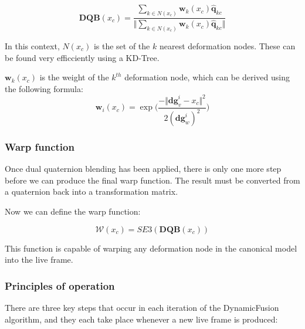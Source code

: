 \documentclass[a4paper]{article}
\begin{document}
$$\textbf{DQB}(x_c) = \frac{\sum_{k \in N(x_c)} \textbf{w}_k(x_c)\hat{\textbf{q}}_{kc}}{\Vert \sum_{k \in N(x_c)} \textbf{w}_k(x_c)\hat{\textbf{q}}_{kc} \Vert}$$

In this context, $N(x_c)$ is the set of the $k$ nearest deformation nodes. These can be found very efficciently using a KD-Tree.

$\textbf{w}_k(x_c)$ is the weight of the $k^{th}$ deformation node, which can be derived using the following formula:
$$\textbf{w}_i(x_c) = \exp \Big(\frac{-\Vert \textbf{dg}^i_v - x_c \Vert ^2}{2(\textbf{dg}^i_w)^2}\Big)$$ 

\subsubsection{Warp function}

Once dual quaternion blending has been applied, there is only one more step before we can produce the final warp function. The result must be converted from a quaternion back into a transformation matrix.

Now we can define the warp function:

$$\mathcal{W}(x_c) = SE3(\textbf{DQB}(x_c))$$

This function is capable of warping any deformation node in the canonical model into the live frame.

\subsubsection{Principles of operation}


There are three key steps that occur in each iteration of the DynamicFusion algorithm, and they each take place whenever a new live frame is produced:
\end{document}
